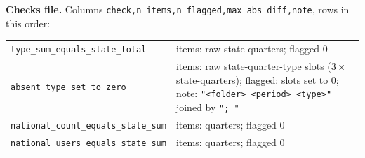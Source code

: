 \documentclass[10pt,a4paper]{article}
\newcommand{\f}[1]{\texttt{#1}}
\begin{document}
\textbf{Checks file.} Columns \f{check,n\_items,n\_flagged,max\_abs\_diff,note}, rows in this order:
\par\noindent\begin{tabularx}{\textwidth}{@{}>{\raggedright\arraybackslash}p{} Y@{}}
\f{type\_sum\_equals\_state\_total} & items: raw state-quarters; flagged 0 \\
\f{absent\_type\_set\_to\_zero} & items: raw state-quarter-type slots ($3\times$ state-quarters); flagged: slots
  set to 0; note: \f{"<folder> <period> <type>"} joined by \f{"; "} \\
\f{national\_count\_equals\_state\_sum} & items: quarters; flagged 0 \\
\f{national\_users\_equals\_state\_sum} & items: quarters; flagged 0 \\
\end{tabularx}
\end{document}
